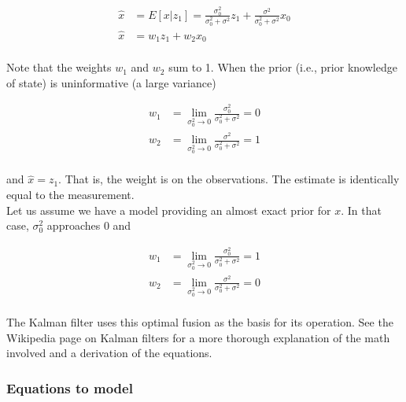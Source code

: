 \documentclass[10pt,conference,compsoc]{IEEEtran}
\begin{document}
\begin{align}
  \hat{x} &= E[x|z_1] = \frac{\sigma_0^2}{\sigma_0^2 + \sigma^2}z_1 +
    \frac{\sigma^2}{\sigma_0^2 + \sigma^2}x_0 \\
  \hat{x} &= w_1 z_1 + w_2 x_0 \nonumber
\end{align}
\\
\noindent Note that the weights $w_1$ and $w_2$ sum to 1. When the prior (i.e.,
prior knowledge of state) is uninformative (a large variance)

\begin{align}
  w_1 &= \lim_{\sigma_0^2 \to 0} \frac{\sigma_0^2}{\sigma_0^2 + \sigma^2} = 0 \\
  w_2 &= \lim_{\sigma_0^2 \to 0} \frac{\sigma^2}{\sigma_0^2 + \sigma^2} = 1
\end{align}
\\
\noindent and $\hat{x} = z_1$. That is, the weight is on the observations. The
estimate is identically equal to the measurement. \\

\noindent Let us assume we have a model providing an almost exact prior for $x$.
In that case, $\sigma_0^2$ approaches 0 and

\begin{align}
  w_1 &= \lim_{\sigma_0^2 \to 0} \frac{\sigma_0^2}{\sigma_0^2 + \sigma^2} = 1 \\
  w_2 &= \lim_{\sigma_0^2 \to 0} \frac{\sigma^2}{\sigma_0^2 + \sigma^2} = 0
\end{align}
\\
\noindent The Kalman filter uses this optimal fusion as the basis for its
operation. See the Wikipedia page on Kalman filters \cite{bib:kalman_filter} for
a more thorough explanation of the math involved and a derivation of the
equations.

\subsubsection{Equations to model}
\end{document}
